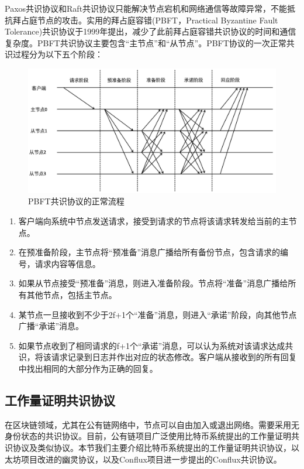 Paxos共识协议和Raft共识协议只能解决节点宕机和网络通信等故障异常，不能抵抗拜占庭节点的攻击。实用的拜占庭容错(PBFT，Practical Byzantine Fault Tolerance)共识协议于1999年提出，减少了此前拜占庭容错共识协议的时间和通信复杂度。PBFT共识协议主要包含“主节点”和“从节点”。PBFT协议的一次正常共识过程分为以下五个阶段：
 
\begin{figure}
\centering  
\includegraphics [width=400pt]{figures/pbft.png}
\caption{PBFT共识协议的正常流程}
\label{fig:pbft}
\end{figure}

\begin{enumerate}
  \item 客户端向系统中节点发送请求，接受到请求的节点将该请求转发给当前的主节点。
  \item 在预准备阶段，主节点将“预准备”消息广播给所有备份节点，包含请求的编号，请求内容等信息。
  \item 如果从节点接受“预准备”消息，则进入准备阶段。节点将“准备”消息广播给所有其他节点，包括主节点。
  \item 某节点一旦接收到不少于2f+1个“准备”消息，则进入“承诺”阶段，向其他节点广播“承诺”消息。
  \item 如果节点收到了相同请求的f+1个“承诺”消息，可以认为系统对该请求达成共识，将该请求记录到日志并作出对应的状态修改。客户端从接收到的所有回复中找出相同的大部分作为正确的回复。
\end{enumerate}

\subsection{工作量证明共识协议}
\label{subsec:work-proof}

在区块链领域，尤其在公有链网络中，节点可以自由加入或退出网络。需要采用无身份状态的共识协议。目前，公有链项目广泛使用比特币系统提出的工作量证明共识协议及类似协议。本节我们主要介绍比特币系统提出的工作量证明共识协议，以太坊项目改进的幽灵协议，以及Conflux项目进一步提出的Conflux共识协议。

